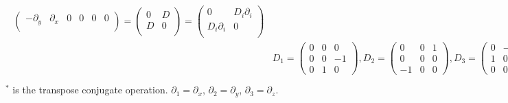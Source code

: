\documentclass[pdftex,a4paper,parskip,listof=totoc,bibliography=totoc,onehalfspacing,12pt]{scrreprt}
\begin{document}
\begin{equation}
\begin{aligned}
\begin{split}
\begin{pmatrix}
   -\partial_{y}	& \partial_{x} 	& 0         	   & 0	       & 0         & 0        \\
 \end{pmatrix} = 
 \begin{pmatrix}
   0          & D         \\
   D          & 0         \\
 \end{pmatrix} = 
 \begin{pmatrix}
   0          & D_i \partial_{i}         \\
   D_i \partial_{i}          & 0         \\
 \end{pmatrix} \\
& D_1= 
 \begin{pmatrix}
   0          & 0        & 0 \\
   0          & 0        & -1 \\
   0          & 1        & 0 
 \end{pmatrix},  D_2= 
 \begin{pmatrix}
   0          & 0        & 1 \\
   0          & 0        & 0 \\
  -1          & 0        & 0 
 \end{pmatrix},
  D_3= 
 \begin{pmatrix}
   0          & -1        & 0 \\
   1          & 0        & 0 \\
   0          & 0        & 0 
 \end{pmatrix} ,
 D_i^{*} = D_i^T = -D_i\\
\end{split}
\end{aligned}
\end{equation}
$^{*}$ is the transpose conjugate operation. $\partial_{1} = \partial_{x}$, $\partial_{2} = \partial_{y}$, $\partial_{3} = \partial_{z}$.\\
\end{document}
